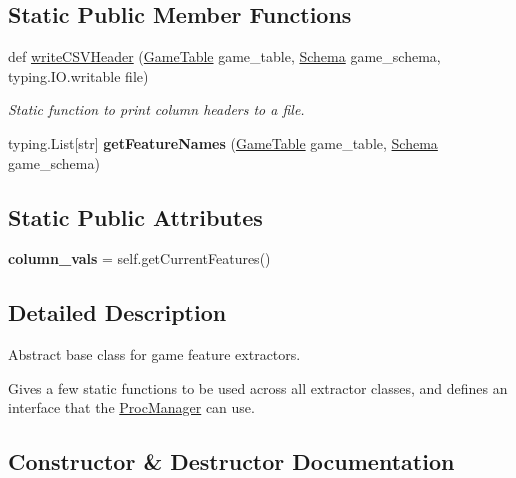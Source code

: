 \subsection*{Static Public Member Functions}
\begin{DoxyCompactItemize}
\item 
def \mbox{\hyperlink{classfeature__extractors_1_1_extractor_1_1_extractor_a7cf66d598a6ec479e3f65db57ec454a0}{write\+C\+S\+V\+Header}} (\mbox{\hyperlink{class_game_table_1_1_game_table}{Game\+Table}} game\+\_\+table, \mbox{\hyperlink{classschemas_1_1_schema_1_1_schema}{Schema}} game\+\_\+schema, typing.\+I\+O.\+writable file)
\begin{DoxyCompactList}\small\item\em Static function to print column headers to a file. \end{DoxyCompactList}\item 
\mbox{\label{classfeature__extractors_1_1_extractor_1_1_extractor_a0b2024828a8be05ca1cadeac54ddc9d9}} 
typing.\+List\mbox{[}str\mbox{]} {\bfseries get\+Feature\+Names} (\mbox{\hyperlink{class_game_table_1_1_game_table}{Game\+Table}} game\+\_\+table, \mbox{\hyperlink{classschemas_1_1_schema_1_1_schema}{Schema}} game\+\_\+schema)
\end{DoxyCompactItemize}
\subsection*{Static Public Attributes}
\begin{DoxyCompactItemize}
\item 
\mbox{\label{classfeature__extractors_1_1_extractor_1_1_extractor_af0798db610596efbedabee5dd257afaa}} 
{\bfseries column\+\_\+vals} = self.\+get\+Current\+Features()
\end{DoxyCompactItemize}


\subsection{Detailed Description}
Abstract base class for game feature extractors. 

Gives a few static functions to be used across all extractor classes, and defines an interface that the \mbox{\hyperlink{class_proc_manager}{Proc\+Manager}} can use. 

\subsection{Constructor \& Destructor Documentation}
\mbox{\label{classfeature__extractors_1_1_extractor_1_1_extractor_a0074111f7f38f5205766e5e88d3fb62c}} 
